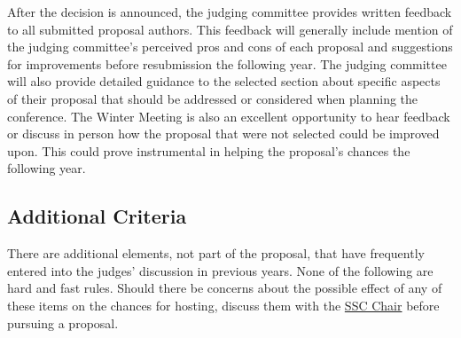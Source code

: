\documentclass[12pt]{article}
\begin{document}
After the decision is announced, the judging committee provides written feedback to all submitted proposal authors.
This feedback will generally include mention of the judging committee’s perceived pros and cons of each proposal and suggestions for improvements
before resubmission the following year.
The judging committee will also provide
detailed guidance to the selected section about specific aspects of their proposal that should be addressed or considered when planning the conference.
The Winter Meeting is also an excellent opportunity to hear feedback or discuss in person how the proposal that were not selected could be improved upon.
This could prove instrumental in helping the proposal's chances the following year.

\subsection{Additional Criteria}
There are additional elements, not part of the proposal, that have frequently entered into the judges’ discussion in previous years.
None of the following are hard and fast rules.
Should there be concerns about the possible effect of any of these items on the chances for hosting, discuss them with the \href{mailto:sscChair@gmail.com}{SSC Chair} before pursuing a proposal.
\end{document}
